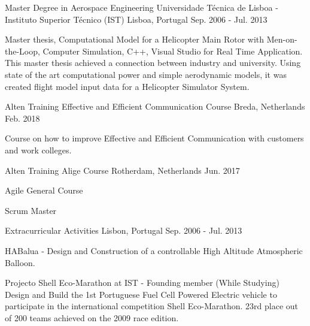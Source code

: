 \begin{cventries}
  \cventry
    {Master Degree in Aerospace Engineering}
    {Universidade Técnica de Lisboa - Instituto Superior Técnico (IST)}
    {Lisboa, Portugal}
    {Sep. 2006 - Jul. 2013}
    {
      \begin{cvitems}
        \item {Master thesis, Computational Model for a Helicopter Main Rotor with Men-on-the-Loop, Computer Simulation, C++, Visual Studio for Real Time Application. 
This master thesis achieved a connection between industry and university. Using state of the art computational power and simple aerodynamic models, it was created flight model input data for a Helicopter Simulator System.
}
      \end{cvitems}
    }
    
    \cventry
    {Alten Training}
    {Effective and Efficient Communication Course}
    {Breda, Netherlands}
    {Feb. 2018}
    {  \begin{cvitems}
        \item Course on how to improve Effective and Efficient Communication with customers and work colleges.
        \end{cvitems}
  }
  
    \cventry
    {Alten Training}
    {Alige Course}
    {Rotherdam, Netherlands}
    {Jun. 2017}
    {  \begin{cvitems}
        \item Agile General Course
        \item Scrum Master
        \end{cvitems}
  }
  
   \cventry
    {}
    {Extracurricular Activities}
    {Lisbon, Portugal}
    {Sep. 2006 - Jul. 2013}
    {
      \begin{cvitems}
    \item {HABalua - Design and Construction of a controllable High Altitude Atmospheric Balloon.}
    \item {Projecto Shell Eco-Marathon at IST - Founding member (While Studying) Design and Build the 1st Portuguese Fuel Cell Powered Electric vehicle to participate in the international competition Shell Eco-Marathon. 23rd place out of 200 teams achieved on the 2009 race edition.} 
      \end{cvitems}
    }
\end{cventries}

